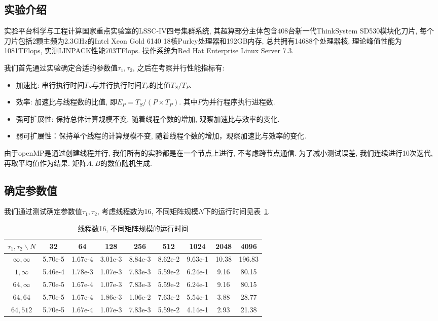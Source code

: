 \documentclass[szjs]{cjcmltx}
\begin{document}
\subsection{实验介绍}
实验平台科学与工程计算国家重点实验室的LSSC-IV四号集群系统, 其超算部分主体包含408台新一代ThinkSystem SD530模块化刀片, 每个刀片包括2颗主频为2.3GHz的Intel Xeon Gold 6140 18核Purley处理器和192GB内存, 总共拥有14688个处理器核, 理论峰值性能为1081TFlops, 实测LINPACK性能703TFlops. 操作系统为Red Hat Enterprise Linux Server 7.3.

我们首先通过实验确定合适的参数值$\tau_1,\tau_2$, 之后在考察并行性能指标有:
\begin{itemize}
\item 加速比: 串行执行时间$T_S$与并行执行时间$T_P$的比值$T_S/T_P$.
\item 效率: 加速比与线程数的比值, 即$E_P=T_S/(P\times T_P)$. 其中$P$为并行程序执行进程数.
\item 强可扩展性: 保持总体计算规模不变, 随着线程个数的增加, 观察加速比与效率的变化.
\item 弱可扩展性：保持单个线程的计算规模不变, 随着线程个数的增加，观察加速比与效率的变化.
\end{itemize}

由于openMP是通过创建线程并行, 我们所有的实验都是在一个节点上进行, 不考虑跨节点通信. 为了减小测试误差, 我们连续进行10次迭代, 再取平均值作为结果. 矩阵$A,B$的数值随机生成.

\subsection{确定参数值}
我们通过测试确定参数值$\tau_1,\tau_2$, 考虑线程数为16, 不同矩阵规模$N$下的运行时间见表~\ref{tab:3}. 

\begin{table}[htbp]\centering\caption{线程数16, 不同矩阵规模的运行时间}\label{tab:3}
\begin{tabular}{|c|c|c|c|c|c|c|c|c|}\hline
$\tau_1,\tau_2\backslash N$ & 32 & 64 & 128 & 256 & 512 & 1024 & 2048 & 4096\\
\hline
$\infty,\infty$ & 5.70e-5 & 1.67e-4 & 3.01e-3 & 8.84e-3 & 8.62e-2 & 9.63e-1 & 10.38 & 196.83\\
\hline
$1,\infty$ &5.46e-4 & 1.78e-3 & 1.07e-3 & 7.83e-3 & 5.59e-2 & 6.24e-1 & 9.16 & 80.15\\
\hline
$64,\infty$ & 5.70e-5 & 1.67e-4 & 1.07e-3 & 7.83e-3 & 5.59e-2 & 6.24e-1 & 9.16 & 80.15\\
\hline
$64,64$ & 5.70e-5 & 1.67e-4 & 1.86e-3 & 1.06e-2 & 7.63e-2 & 5.54e-1 & 3.88 & 28.77\\
\hline
$64,512$ & 5.70e-5 & 1.67e-4 & 1.07e-3 & 7.83e-3 & 5.59e-2 & 4.14e-1 & 2.93 & 21.38\\
\hline
\end{tabular}
\end{table}
\end{document}
